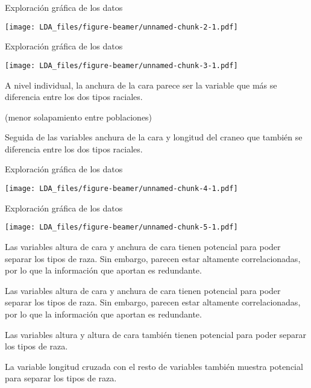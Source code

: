 \documentclass[ignorenonframetext,]{beamer}
\newenvironment{Shaded}{\begin{snugshade}}{\end{snugshade}}
\newcommand{\KeywordTok}[1]{\textcolor[rgb]{0.13,0.29,0.53}{\textbf{#1}}}
\newcommand{\DataTypeTok}[1]{\textcolor[rgb]{0.13,0.29,0.53}{#1}}
\newcommand{\DecValTok}[1]{\textcolor[rgb]{0.00,0.00,0.81}{#1}}
\newcommand{\StringTok}[1]{\textcolor[rgb]{0.31,0.60,0.02}{#1}}
\newcommand{\OperatorTok}[1]{\textcolor[rgb]{0.81,0.36,0.00}{\textbf{#1}}}
\newcommand{\NormalTok}[1]{#1}
\begin{document}
\begin{frame}{Exploración gráfica de los datos}

\texttt{[image: LDA\_files/figure-beamer/unnamed-chunk-2-1.pdf]}

\end{frame}

\begin{frame}{Exploración gráfica de los datos}

\hypertarget{left}{}
\texttt{[image: LDA\_files/figure-beamer/unnamed-chunk-3-1.pdf]}

\hypertarget{right}{}
A nivel individual, la anchura de la cara parece ser la variable que más
se diferencia entre los dos tipos raciales.

(menor solapamiento entre poblaciones)

Seguida de las variables anchura de la cara y longitud del craneo que
también se diferencia entre los dos tipos raciales.

\end{frame}

\begin{frame}{Exploración gráfica de los datos}

\texttt{[image: LDA\_files/figure-beamer/unnamed-chunk-4-1.pdf]}

\end{frame}

\begin{frame}[fragile]{Exploración gráfica de los datos}

\hypertarget{left}{}
\texttt{[image: LDA\_files/figure-beamer/unnamed-chunk-5-1.pdf]}

\hypertarget{right}{}
\begin{Shaded}
\end{Shaded}

Las variables altura de cara y anchura de cara tienen potencial para
poder separar los tipos de raza. Sin embargo, parecen estar altamente
correlacionadas, por lo que la información que aportan es redundante.

Las variables altura de cara y anchura de cara tienen potencial para
poder separar los tipos de raza. Sin embargo, parecen estar altamente
correlacionadas, por lo que la información que aportan es redundante.

Las variables altura y altura de cara también tienen potencial para
poder separar los tipos de raza.

La variable longitud cruzada con el resto de variables también muestra
potencial para separar los tipos de raza.

\end{frame}
\end{document}
